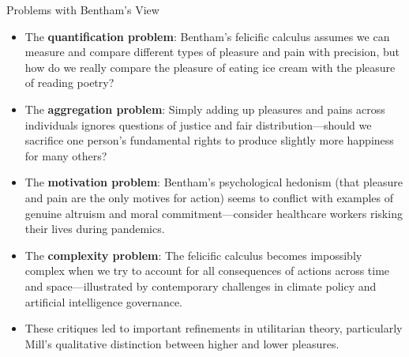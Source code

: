 \documentclass[aspectratio=169]{beamer}
\begin{document}
\begin{frame}{Problems with Bentham's View}
    \begin{itemize}
        \item The \textbf{quantification problem}: Bentham's felicific calculus assumes we can measure and compare different types of pleasure and pain with precision, but how do we really compare the pleasure of eating ice cream with the pleasure of reading poetry?
        
        \item The \textbf{aggregation problem}: Simply adding up pleasures and pains across individuals ignores questions of justice and fair distribution—should we sacrifice one person's fundamental rights to produce slightly more happiness for many others?
        
        \item The \textbf{motivation problem}: Bentham's psychological hedonism (that pleasure and pain are the only motives for action) seems to conflict with examples of genuine altruism and moral commitment—consider healthcare workers risking their lives during pandemics.
        
        \item The \textbf{complexity problem}: The felicific calculus becomes impossibly complex when we try to account for all consequences of actions across time and space—illustrated by contemporary challenges in climate policy and artificial intelligence governance.
        
        \item These critiques led to important refinements in utilitarian theory, particularly Mill's qualitative distinction between higher and lower pleasures.
    \end{itemize}
\end{frame}
\end{document}
